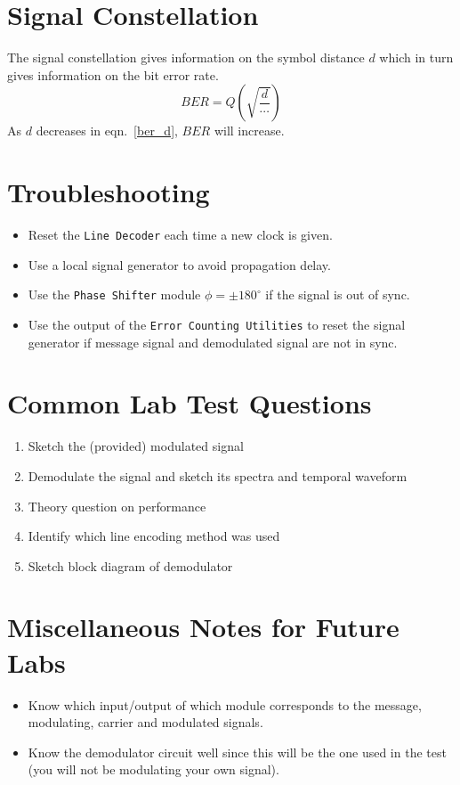 \documentclass[a4paper]{article}
\begin{document}
\section{Signal Constellation}
The signal constellation gives information on the symbol distance $d$ which in turn gives information on the bit error rate. 
	\begin{equation}
		BER = Q\left(\sqrt{\frac{d}{\cdots}}\right) \label{ber_d}
	\end{equation}
As $d$ decreases in eqn.~\eqref{ber_d}, $BER$ will increase.

\section{Troubleshooting}
\begin{itemize}
	\item Reset the \texttt{Line Decoder} each time a new clock is given.
	\item Use a local signal generator to avoid propagation delay.
	\item Use the \texttt{Phase Shifter} module $\phi = \pm 180^{\circ}$ if the signal is out of sync.
	\item Use the output of the \texttt{Error Counting Utilities} to reset the signal generator if message signal and demodulated signal are not in sync.
\end{itemize}

\section{Common Lab Test Questions}
\begin{enumerate}
	\item Sketch the (provided) modulated signal
	\item Demodulate the signal and sketch its spectra and temporal waveform
	\item Theory question on performance
	\item Identify which line encoding method was used
	\item Sketch block diagram of demodulator
\end{enumerate}

\section{Miscellaneous Notes for Future Labs}
\begin{itemize}
	\item Know which input/output of which module corresponds to the message, modulating, carrier and modulated signals.
	\item Know the demodulator circuit well since this will be the one used in the test (you will not be modulating your own signal).
\end{itemize}
\end{document}
